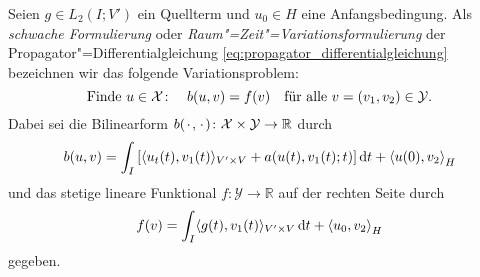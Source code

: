 \documentclass[../main.tex]{subfiles}
\begin{document}
\begin{Definition}
\label{definition:raum_zeit_variationsformulierung}
    Seien $g \in L_{2}(I; V')$ ein Quellterm und $u_{0} \in H$ eine Anfangsbedingung.
    Als \emph{schwache Formulierung} oder \emph{Raum"=Zeit"=Variationsformulierung} der Propagator"=Differentialgleichung \cref{eq:propagator_differentialgleichung} bezeichnen wir das folgende Variationsproblem:
    \begin{equation}
    \label{eq:raum_zeit_variationsformulierung}
        \text{Finde}~u \in \mathcal X \colon \quad  b(u, v) = f(v) \quad \fa v = (v_{1}, v_{2}) \in \mathcal Y.
    \end{equation}
    Dabei sei die Bilinearform $b({\mkern2mu\cdot\mkern2mu}, {\mkern2mu\cdot\mkern2mu}) \colon \mathcal X \times \mathcal Y \to \mathbb{R}$ durch
    \begin{equation}
        \label{eq:raum_zeit_variationsformulierung:lhs}
        b(u, v)
            = \int_{I} \left[ \skp{u_{t}(t)}{v_{1}(t)}{V' \times V} + a(u(t), v_{1}(t); t) \right]  \diff t + \skprod{u(0)}{v_{2}}_{H}
    \end{equation}
    und das stetige lineare Funktional $f \colon \mathcal Y \to \mathbb{R}$ auf der rechten Seite durch
    \begin{equation}
        \label{eq:raum_zeit_variationsformulierung:rhs}
        f(v) = \int_{I} \skp{g(t)}{v_{1}(t)}{V' \times V} \diff t + \skprod{u_{0}}{v_{2}}_{H}
    \end{equation}
    gegeben.
\end{Definition}
\end{document}
